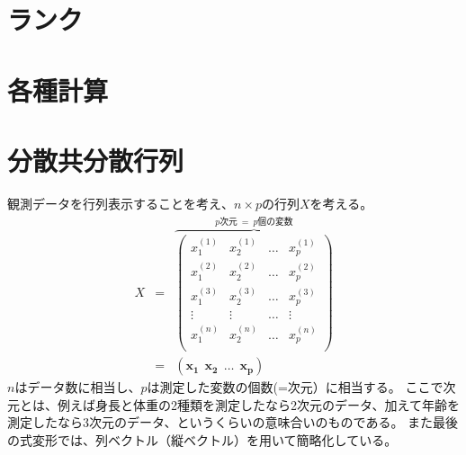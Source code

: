 \section{ランク}

\section{各種計算}

\section{分散共分散行列}

観測データを行列表示することを考え、$n\times p$の行列$X$を考える。
\begin{eqnarray}
  X &=&
  \overbrace{
    \left(
  \begin{array}{cccc}
    x_1^{(1)} & x_2^{(1)} & \dots & x_p^{(1)} \\
    x_1^{(2)} & x_2^{(2)} & \dots & x_p^{(2)} \\
    x_1^{(3)} & x_2^{(3)} & \dots & x_p^{(3)} \\
    \vdots    & \vdots    & \dots & \vdots    \\
    x_1^{(n)} & x_2^{(n)} & \dots & x_p^{(n)} \\
  \end{array}
  \right)}^{p次元 ~=~ p個の変数} \\
  &=& (\bm{x_1}~~\bm{x_2}~~\dots~~\bm{x_p})
\end{eqnarray}
$n$はデータ数に相当し、$p$は測定した変数の個数(=次元）に相当する。
ここで次元とは、例えば身長と体重の2種類を測定したなら2次元のデータ、加えて年齢を測定したなら3次元のデータ、というくらいの意味合いのものである。
また最後の式変形では、列ベクトル（縦ベクトル）を用いて簡略化している。

